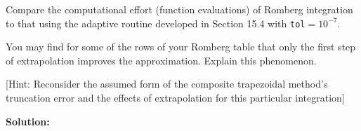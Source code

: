 \documentclass[12pt]{article}
\begin{document}
\begin{enumerate}
Compare the computational effort (function evaluations) of Romberg integration to that using the adaptive routine developed in Section 15.4 with {\tt tol}$= 10^{-7}$.

You may find for some of the rows of your Romberg table that only the first step of extrapolation improves the approximation. Explain this phenomenon.

[Hint: Reconsider the assumed form of the composite trapezoidal method's truncation error and the effects of extrapolation for this particular integration]

{\bf Solution:}

\end{enumerate}

\end{document}
